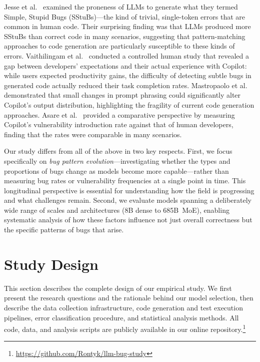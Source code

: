 \documentclass[smallextended]{svjour3}
\begin{document}
Jesse et al.\ \citep{jesse2023llm} examined the proneness of LLMs to generate what they termed Simple, Stupid Bugs (SStuBs)---the kind of trivial, single-token errors that are common in human code. Their surprising finding was that LLMs produced more SStuBs than correct code in many scenarios, suggesting that pattern-matching approaches to code generation are particularly susceptible to these kinds of errors. Vaithilingam et al.\ \citep{vaithilingam2022expectation} conducted a controlled human study that revealed a gap between developers' expectations and their actual experience with Copilot: while users expected productivity gains, the difficulty of detecting subtle bugs in generated code actually reduced their task completion rates. Mastropaolo et al.\ \citep{mastropaolo2023robustness} demonstrated that small changes in prompt phrasing could significantly alter Copilot's output distribution, highlighting the fragility of current code generation approaches. Asare et al.\ \citep{asare2023copilot} provided a comparative perspective by measuring Copilot's vulnerability introduction rate against that of human developers, finding that the rates were comparable in many scenarios.

Our study differs from all of the above in two key respects. First, we focus specifically on \emph{bug pattern evolution}---investigating whether the types and proportions of bugs change as models become more capable---rather than measuring bug rates or vulnerability frequencies at a single point in time. This longitudinal perspective is essential for understanding how the field is progressing and what challenges remain. Second, we evaluate models spanning a deliberately wide range of scales and architectures (8B dense to 685B~MoE), enabling systematic analysis of how these factors influence not just overall correctness but the specific patterns of bugs that arise.

\section{Study Design}
\label{sec:study_design}

This section describes the complete design of our empirical study. We first present the research questions and the rationale behind our model selection, then describe the data collection infrastructure, code generation and test execution pipelines, error classification procedure, and statistical analysis methods. All code, data, and analysis scripts are publicly available in our online repository.\footnote{\url{https://github.com/Rontyk/llm-bug-study}}
\end{document}
